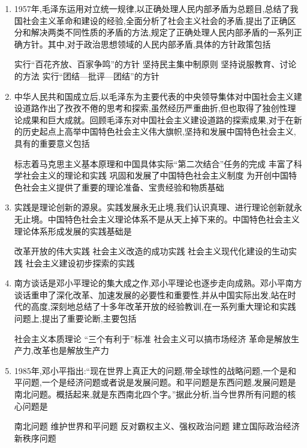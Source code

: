\documentclass[12pt, a4paper, oneside, UTF8]{ctexbook}
\begin{document}
\begin{enumerate}
    \item 1957年,毛泽东运用对立统一规律,以正确处理人民内部矛盾为总题目,总结了我国社会主义革命和建设的经验,全面分析了社会主义社会的矛盾,提出了正确区分和解决两类不同性质的矛盾的方法,规定了正确处理人民内部矛盾的一系列正确方针。其中,对于政治思想领域的人民内部矛盾,具体的方针政策包括
    \begin{choices}[1]
    \task 实行“百花齐放、百家争鸣”的方针
    \task 坚持民主集中制原则
    \task 坚持说服教育、讨论的方法
    \task 实行“团结—批评—团结”的方针
    \end{choices}

    \item 中华人民共和国成立后,以毛泽东为主要代表的中央领导集体对中国社会主义建设道路作出了孜孜不倦的思考和探索,虽然经历严重曲折,但也取得了独创性理论成果和巨大成就。回顾毛泽东对中国社会主义建设道路的探索成果,对于在新的历史起点上高举中国特色社会主义伟大旗帜,坚持和发展中国特色社会主义,具有的重要意义包括
    \begin{choices}[1]
    \task 标志着马克思主义基本原理和中国具体实际“第二次结合”任务的完成
    \task 丰富了科学社会主义的理论和实践
    \task 巩固和发展了中国特色社会主义制度
    \task 为开创中国特色社会主义提供了重要的理论准备、宝贵经验和物质基础
    \end{choices}

    \item 实践是理论创新的源泉。实践发展永无止境,我们认识真理、进行理论创新就永无止境。中国特色社会主义理论体系不是从天上掉下来的。中国特色社会主义理论体系形成发展的实践基础是
    \begin{choices}[1]
    \task 改革开放的伟大实践
    \task 社会主义改造的成功实践
    \task 社会主义现代化建设的生动实践
    \task 社会主义建设初步探索的实践
    \end{choices}

    \item 南方谈话是邓小平理论的集大成之作,邓小平理论也逐步走向成熟。邓小平南方谈话重申了深化改革、加速发展的必要性和重要性,并从中国实际出发,站在时代的高度,深刻地总结了十多年改革开放的经验教训,在一系列重大理论和实践问题上,提出了重要论断,主要包括
    \begin{choices}[1]
    \task 社会主义本质理论
    \task “三个有利于”标准
    \task 社会主义可以搞市场经济
    \task 革命是解放生产力,改革也是解放生产力
    \end{choices}

    \item 1985年,邓小平指出:“现在世界上真正大的问题,带全球性的战略问题,一个是和平问题,一个是经济问题或者说是发展问题。和平问题是东西问题,发展问题是南北问题。概括起来,就是东西南北四个字。”据此分析,当今世界所有问题的核心问题是
    \begin{choices}[2]
    \task 南北问题
    \task 维护世界和平问题
    \task 反对霸权主义、强权政治问题
    \task 建立国际政治经济新秩序问题
    \end{choices}


\end{enumerate}
\end{document}
